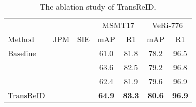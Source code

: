 \documentclass[10pt,twocolumn,letterpaper]{article}
\begin{document}
\renewcommand{\multirowsetup}{\centering}
\begin{table}[hb]
\footnotesize
    \begin{center}
    \begin{tabular}{ lcc|cc|cc}
    \hline
     & & &\multicolumn{2}{c|}{MSMT17} & \multicolumn{2}{c}{VeRi-776} \\
    Method   & JPM & SIE   & mAP    & R1  & mAP & R1  \\
    \hline
    \hline
    Baseline  &  &        & 61.0  & 81.8  & 78.2  & 96.5 \\
      &  &              & 63.6  & 82.5  & 79.2  & 96.8 \\
    &      &   & 62.4  & 81.9  &  79.6 & 96.9  \\
    TransReID  &      &      & \textbf{64.9}  &\textbf{83.3}  &\textbf{ 80.6}  &\textbf{96.9}  \\
    \hline
    \end{tabular}
    \vspace{-0.5em}
    \end{center}
    \caption{\label{tab:transreid} The ablation study of TransReID.}
    \vspace{-0.5em}
\end{table}
\end{document}
